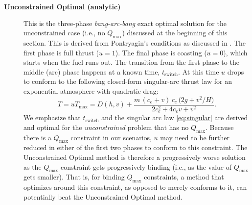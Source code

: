 \documentclass[mnsc,sglanonrev]{informs4}
\begin{document}
\begin{description}
  \item[\textbf{Unconstrained Optimal (analytic)}] This is the three-phase \emph{bang-arc-bang} exact optimal solution for the unconstrained case (i.e., no $Q_{\max}$) discussed at the beginning of this section. This is derived from Pontryagin's conditions as discussed in \cite{bonnans2008singular}. The first phase is full thrust ($u=1$). The final phase is coasting ($u=0$), which starts when the fuel runs out. The transition from the first phase to the middle (arc) phase happens at a known time, $t_{\mathrm{switch}}$. At this time $u$ drops to conform to the following closed-form singular-arc thrust law for an exponential atmosphere with quadratic drag: 
    \begin{equation}
      T=uT_{\max} = D(h,v) + \frac{m\,(c_e+v)\,c_e\,\bigl(2g + v^2/H\bigr)}
                                 {2c_e^2 + 4c_e v + v^2}.
      \label{eq:singular}
    \end{equation}
  We emphasize that $t_{\mathrm{switch}}$ and the singular arc law \eqref{eq:singular} are derived and optimal for the \emph{unconstrained} problem that has no $Q_{\max}$. Because there is a $Q_{\max}$ constraint in our scenarios, $u$ may need to be further reduced in either of the first two phases to conform to this constraint. The Unconstrained Optimal method is therefore a progressively worse solution as the $Q_{\max}$ constraint gets progressively binding (i.e., as the value of $Q_{\max}$ gets smaller). That is, for binding $Q_{\max}$ constraints, a method that optimizes around this constraint, as opposed to merely conforms to it, can potentially beat the Unconstrained Optimal method.


\end{description}
\end{document}
